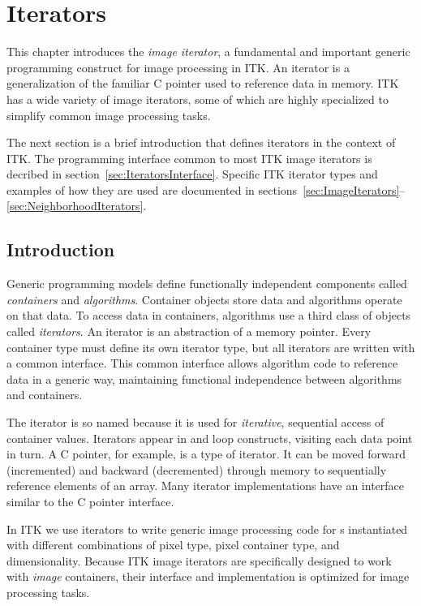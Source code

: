\chapter{Iterators}

This chapter introduces the \emph{image iterator}, a fundamental and important
generic programming construct for image processing in ITK.  An iterator is a
generalization of the familiar C pointer used to reference data in
memory.  ITK has a wide variety of image iterators, some of which are highly
specialized to simplify common image processing tasks.

The next section is a brief introduction that defines iterators in the
context of ITK.  The programming interface common to most ITK image iterators
is decribed in section~\ref{sec:IteratorsInterface}.  Specific ITK iterator
types and examples of how they are used are documented in
sections~\ref{sec:ImageIterators}--\ref{sec:NeighborhoodIterators}.

\section{Introduction}
\label{sec:IteratorsIntroduction}
Generic programming models define functionally independent components called
\emph{containers} and \emph{algorithms}.  Container objects store data and
algorithms operate on that data.  To access data in containers, algorithms use
a third class of objects called \emph{iterators}.  An iterator is an
abstraction of a memory pointer.  Every container type must define its own
iterator type, but all iterators are written with a common interface.  This
common interface allows algorithm code to reference data in a generic way,
maintaining functional independence between algorithms and containers.

The iterator is so named because it is used for \emph{iterative}, sequential
access of container values.  Iterators appear in  and
 loop constructs, visiting each data point in turn.  A C pointer,
for example, is a type of iterator.  It can be moved forward (incremented) and
backward (decremented) through memory to sequentially reference elements of an
array. Many iterator implementations have an interface similar to the
C pointer interface. 

In ITK we use iterators to write generic image processing code for
s instantiated with different combinations of pixel type, pixel
container type, and dimensionality.  Because ITK image iterators are
specifically designed to work with \emph{image} containers, their interface and
implementation is optimized for image processing tasks.

